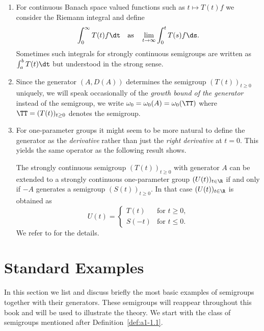 \begin{remarks}\label{rem:a1-1.12}
\begin{enumerate}[\upshape(i), wide, labelindent=.25em]
\item 
For continuous Banach space valued functions such as $t \mapsto T(t)f$ we consider the Riemann integral and define 
\[
	\int_{0}^{\infty}T(t)f  \dt 
		\quad \text{as} \quad
	\lim_{t \to \infty}\int_{0}^{t}T(s)f  \ds .
\]
Sometimes such integrals for strongly continuous semigroups are written as $\int_{a}^{b}T(t) \dt$ but understood in the strong sense.

\item 
Since the generator $(A,D(A))$ determines the semigroup $(T(t))_{t \geq 0}$ uniquely, we will speak occasionally of the \emph{growth bound of the generator} instead of the semigroup, \ie we write $\omega_{0} = \omega_{0}(A) = \omega_{0}(\TT)$ where $\TT = (T(t))_{t \geq 0}$ denotes the semigroup.

\item 
For one-parameter groups it might seem to be more natural to define the generator as the \emph{derivative} rather than just the \emph{right derivative} at $t = 0$.
This yields the same operator as the following result shows.

The strongly continuous semigroup $(T(t))_{t \geq 0}$ with generator $A$ can be extended to a strongly continuous one-parameter group $(U(t))_{t \in \R}$ if and only if\/ $-A$ generates a semigroup $(S(t))_{t \geq 0}$.
In that case $(U(t))_{t \in \R}$ is obtained as
\[
    U(t) = \begin{cases}
        T(t) & \text{for } t \geq 0 ,\\
        S(-t) & \text{for } t \leq 0 .
    \end{cases}
\]
We refer to \textcite[Proposition~1.14]{davies:1980} for the details.

\end{enumerate}
\end{remarks}
\section{Standard Examples}\label{sec:a1-2}%
In this section we list and discuss briefly the most basic examples of semigroups together with their generators.
These semigroups will reappear throughout this book and will be used to illustrate the theory.
We start with the class of semigroups mentioned after Definition~\ref{def:a1-1.1}.
